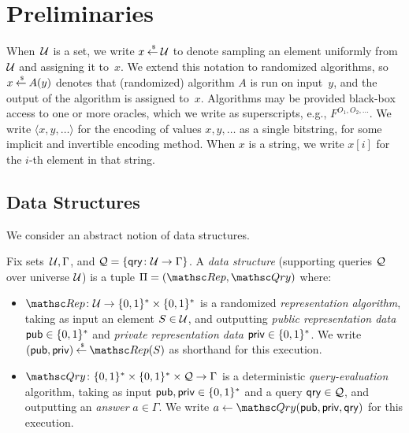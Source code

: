 \newcommand{\qry}{\mathsf{qry}}
\section{Preliminaries}

When~${\cal U}$ is a set, we write $x {\:\stackrel{{\scriptscriptstyle \hspace{0.2em}\$}} {\leftarrow}\:} {\cal U}$ to denote sampling
an element uniformly from~${\cal U}$ and assigning it to~$x$. We extend
this notation to randomized algorithms, so $x {\:\stackrel{{\scriptscriptstyle \hspace{0.2em}\$}} {\leftarrow}\:} A(y)$ denotes
that (randomized) algorithm $A$ is run on input~$y$, and the output
of the algorithm is assigned to~$x$. Algorithms may be provided
black-box access to one or more oracles, which we write as
superscripts, e.g., $F^{O_1,O_2,\ldots}$.  We write $\langle
x,y,\ldots \rangle$ for the encoding of values $x,y,\ldots$ as a
single bitstring, for some implicit and invertible encoding method.
When $x$ is a string, we write $x[i]$ for the $i$-th element in that string.

\subsection{Data Structures}

We consider an abstract notion of data structures.

\begin{definition} \rm
Fix sets~${\cal U}, \Gamma$, and $\calQ = \{\qry \colon \univ \to
\Gamma\}$. A \emph{data structure} (supporting queries ${\cal Q}$ over
universe ${\cal U}$) is a tuple $\setprim=(\Rep, \Qry)$ where:
\begin{itemize}
\item $\Rep \colon \univ \to \bits^* \times \bits^*$ is a
    randomized \emph{representation algorithm}, taking as input
    an element $S \in {\cal U}$,
    and outputting %
    \emph{public representation data} ${\sf pub} \in \{0,1\}^*$ and
    \emph{private representation data} ${\sf priv} \in \{0,1\}^*$.
    We write $(\pubaux,\privaux) \getsr \Rep(S)$ as shorthand
    for this execution.
\item $\Qry\colon \bits^* \times \bits^* \times \calQ \to
    \Gamma$ is a deterministic \emph{query-evaluation}
    algorithm, taking as input ${\sf pub},{\sf priv} \in \{0,1\}^*$
    and a query $\qry \in \calQ$, and outputting an
    \emph{answer} $a \in \Gamma$.  We write $a \gets
    \Qry(\pubaux,\privaux,\qry)$ for this execution. \hfill\dqed
\end{itemize}
\end{definition}

